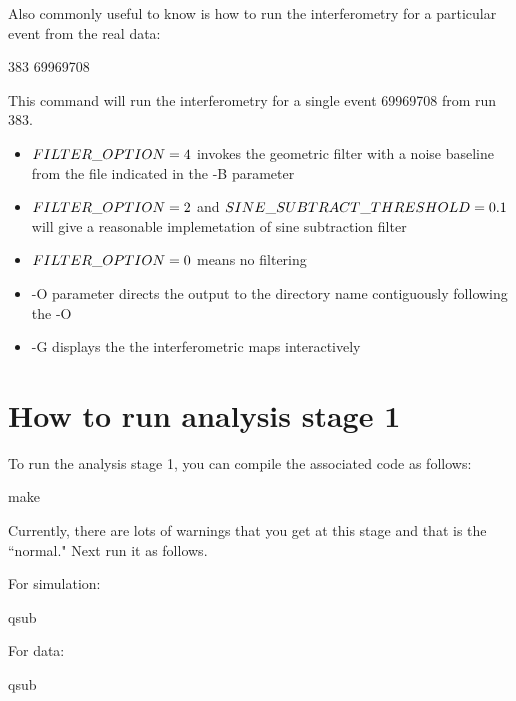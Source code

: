 Also commonly useful to know is how to run the interferometry for a particular event from the real data:

\begin{center}
 383 69969708
\end{center}

This command will run the interferometry for a single event  69969708 from run 383. 

\begin{itemize}

\item $FILTER\char`_OPTION=4$ invokes the geometric filter with a noise baseline from the file indicated in the -B parameter

\item $FILTER\char`_OPTION=2$ and $SINE\char`_SUBTRACT\char`_THRESHOLD=0.1$ will give a reasonable implemetation of sine subtraction filter

\item $FILTER\char`_OPTION=0$ means no filtering

\item -O parameter directs the output to the directory name contiguously following the -O

\item -G displays the the interferometric maps interactively

\end{itemize}


\section{How to run analysis stage 1}

To run the analysis stage 1, you can compile the associated code as follows:

\begin{center}
make  
\end{center}

Currently, there are lots of warnings that you get at this stage and that is the ``normal." Next run it as follows. 

For simulation:
\begin{center}
qsub 
\end{center}

For data:
\begin{center}
qsub 
\end{center}

